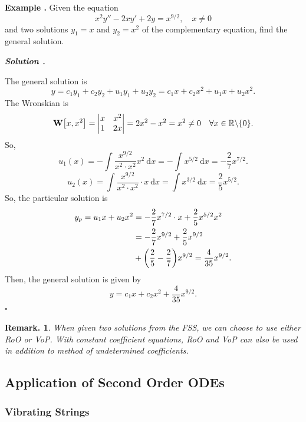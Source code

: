 \documentclass[12pt, a4paper]{article}
\newcounter{index}[subsection]
\newenvironment*{eg}{\begin{framed}\par\noindent\textbf{Example \thesubsection.\stepcounter{index}\theindex}}{\par\end{framed}}
\newcounter{nprf}[subsection]
\newenvironment*{sol}{\par\indent\textbf{\textit{Solution \stepcounter{nprf}\thenprf.}}\par}{\hfill{$\square$}\par}
\newtheorem*{rmk}{Remark.}
\def\R{{\mathbb{R}}}
\def\d{{\mathrm{d}}}
\def\W{\vb W}
\begin{document}
\begin{eg}
	Given the equation \[x^2y''-2xy'+2y=x^{9/2},\quad x\neq0\] and two solutions $y_1=x$ and $y_2=x^2$ of the complementary equation, find the general solution. 
	\begin{sol}
		The general solution is \[y=c_1y_1+c_2y_2+u_1y_1+u_2y_2=c_1x+c_2x^2+u_1x+u_2x^2.\] The Wronskian is \[\W\qty[x,x^2]=\mqty|x&x^2\\1&2x|=2x^2-x^2=x^2\neq0\quad\forall x\in\R\backslash\qty{0}.\] So, \[u_1(x)=-\int\dfrac{x^{9/2}}{x^2\cdot x^2}x^2\ \d{x}=-\int x^{5/2}\ \d{x}=-\dfrac{2}{7}x^{7/2}.\] \[u_2(x)=\int\dfrac{x^{9/2}}{x^2\cdot x^2}\cdot x\ \d{x}=\int x^{3/2}\ \d{x}=\dfrac{2}{5}x^{5/2}.\] So, the particular solution is \begin{align*}y_p=u_1x+u_2x^2&=-\dfrac{2}{7}x^{7/2}\cdot x+\dfrac{2}{5}x^{5/2}x^2\\&=-\dfrac{2}{7}x^{9/2}+\dfrac{2}{5}x^{9/2}\\&+\qty(\dfrac{2}{5}-\dfrac{2}{7})x^{9/2}=\dfrac{4}{35}x^{9/2}.\end{align*} Then, the general solution is given by \[y=c_1x+c_2x^2+\dfrac{4}{35}x^{9/2}.\]
	\end{sol}
\end{eg}
\begin{rmk}
	When given two solutions from the FSS, we can choose to use either RoO or VoP. With constant coefficient equations, RoO and VoP can also be used in addition to method of undetermined coefficients. 
\end{rmk}

\subsection{Application of Second Order ODEs}
\subsubsection{Vibrating Strings}
\end{document}
